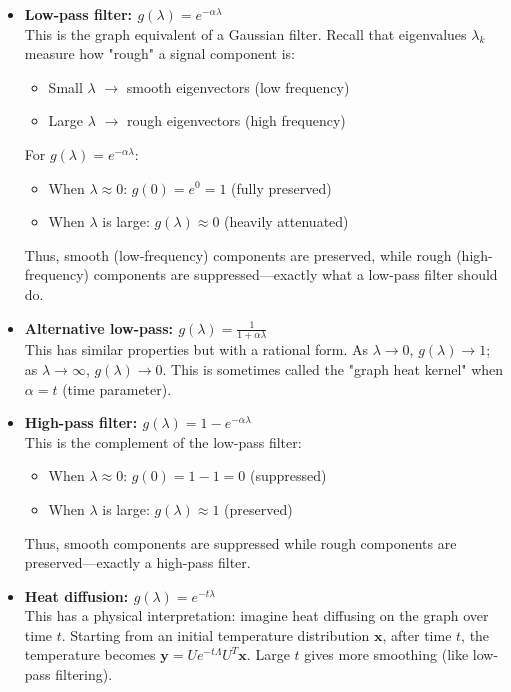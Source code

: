 \begin{notechapter}
\begin{itemize}
\item \textbf{Low-pass filter: $g(\lambda) = e^{-\alpha \lambda}$} \\
This is the graph equivalent of a Gaussian filter. Recall that eigenvalues 
$\lambda_k$ measure how "rough" a signal component is:
\begin{itemize}
    \item Small $\lambda$ $\rightarrow$ smooth eigenvectors (low frequency)
    \item Large $\lambda$ $\rightarrow$ rough eigenvectors (high frequency)
\end{itemize}
For $g(\lambda) = e^{-\alpha \lambda}$:
\begin{itemize}
    \item When $\lambda \approx 0$: $g(0) = e^0 = 1$ (fully preserved)
    \item When $\lambda$ is large: $g(\lambda) \approx 0$ (heavily attenuated)
\end{itemize}
Thus, smooth (low-frequency) components are preserved, while rough 
(high-frequency) components are suppressed---exactly what a low-pass 
filter should do.

\item \textbf{Alternative low-pass: $g(\lambda) = \frac{1}{1 + \alpha\lambda}$} \\
This has similar properties but with a rational form. As $\lambda \to 0$, 
$g(\lambda) \to 1$; as $\lambda \to \infty$, $g(\lambda) \to 0$. This is 
sometimes called the "graph heat kernel" when $\alpha = t$ (time parameter).

\item \textbf{High-pass filter: $g(\lambda) = 1 - e^{-\alpha \lambda}$} \\
This is the complement of the low-pass filter:
\begin{itemize}
    \item When $\lambda \approx 0$: $g(0) = 1 - 1 = 0$ (suppressed)
    \item When $\lambda$ is large: $g(\lambda) \approx 1$ (preserved)
\end{itemize}
Thus, smooth components are suppressed while rough components are 
preserved---exactly a high-pass filter.

\item \textbf{Heat diffusion: $g(\lambda) = e^{-t\lambda}$} \\
This has a physical interpretation: imagine heat diffusing on the graph 
over time $t$. Starting from an initial temperature distribution $\mathbf{x}$, 
after time $t$, the temperature becomes $\mathbf{y} = U e^{-t\Lambda} U^T \mathbf{x}$. 
Large $t$ gives more smoothing (like low-pass filtering).


\end{itemize}
\end{notechapter}
